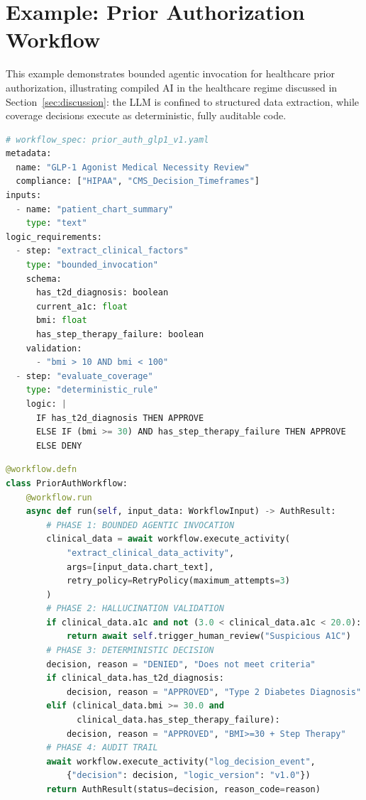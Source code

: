 \documentclass[11pt]{article}
\begin{document}
\appendix

\section{Example: Prior Authorization Workflow}
\label{app:example}

This example demonstrates bounded agentic invocation for healthcare prior authorization, illustrating compiled AI in the healthcare regime discussed in Section~\ref{sec:discussion}: the LLM is confined to structured data extraction, while coverage decisions execute as deterministic, fully auditable code.

\begin{lstlisting}[language=Python, caption={Workflow specification for GLP-1 prior authorization}, basicstyle=\small\ttfamily]
# workflow_spec: prior_auth_glp1_v1.yaml
metadata:
  name: "GLP-1 Agonist Medical Necessity Review"
  compliance: ["HIPAA", "CMS_Decision_Timeframes"]
inputs:
  - name: "patient_chart_summary"
    type: "text"
logic_requirements:
  - step: "extract_clinical_factors"
    type: "bounded_invocation"
    schema:
      has_t2d_diagnosis: boolean
      current_a1c: float
      bmi: float
      has_step_therapy_failure: boolean
    validation:
      - "bmi > 10 AND bmi < 100"
  - step: "evaluate_coverage"
    type: "deterministic_rule"
    logic: |
      IF has_t2d_diagnosis THEN APPROVE
      ELSE IF (bmi >= 30) AND has_step_therapy_failure THEN APPROVE
      ELSE DENY
\end{lstlisting}

\begin{lstlisting}[language=Python, caption={Compiled artifact isolating probabilistic extraction from deterministic decisions}, basicstyle=\small\ttfamily]
@workflow.defn
class PriorAuthWorkflow:
    @workflow.run
    async def run(self, input_data: WorkflowInput) -> AuthResult:
        # PHASE 1: BOUNDED AGENTIC INVOCATION
        clinical_data = await workflow.execute_activity(
            "extract_clinical_data_activity",
            args=[input_data.chart_text],
            retry_policy=RetryPolicy(maximum_attempts=3)
        )
        # PHASE 2: HALLUCINATION VALIDATION
        if clinical_data.a1c and not (3.0 < clinical_data.a1c < 20.0):
            return await self.trigger_human_review("Suspicious A1C")
        # PHASE 3: DETERMINISTIC DECISION
        decision, reason = "DENIED", "Does not meet criteria"
        if clinical_data.has_t2d_diagnosis:
            decision, reason = "APPROVED", "Type 2 Diabetes Diagnosis"
        elif (clinical_data.bmi >= 30.0 and
              clinical_data.has_step_therapy_failure):
            decision, reason = "APPROVED", "BMI>=30 + Step Therapy"
        # PHASE 4: AUDIT TRAIL
        await workflow.execute_activity("log_decision_event",
            {"decision": decision, "logic_version": "v1.0"})
        return AuthResult(status=decision, reason_code=reason)
\end{lstlisting}
\end{document}
